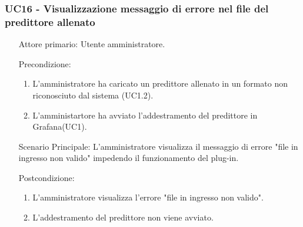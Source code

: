 \subsubsection{UC16 - Visualizzazione messaggio di errore nel file del predittore allenato}
\label{sssec:uc16}
\begin{description}
	\begin{enumerate}
		\item[Attore primario:] Utente amministratore.
		\item[Precondizione:]
		\begin{enumerate}
			\item L'amministratore ha caricato un predittore allenato in un formato non riconosciuto dal sistema (UC1.2).
			\item L'amministartore ha avviato l'addestramento del predittore in Grafana(UC1).
		\end{enumerate}
		\item[Scenario Principale:] L'amministratore visualizza il messaggio di errore "file in ingresso non valido" impedendo il funzionamento del plug-in.
		\item[Postcondizione:]
		\begin{enumerate}
			\item L'amministratore visualizza l'errore "file in ingresso non valido".
			\item L'addestramento del predittore non viene avviato.
		\end{enumerate}
	\end{enumerate}
\end{description}